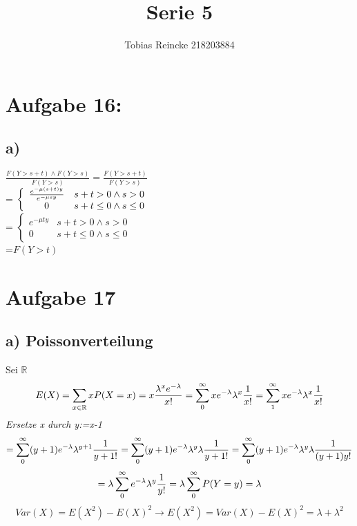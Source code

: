 \documentclass[11pt]{article} %
\title{\color{blue} Serie 5 }
\author{Tobias Reincke 218203884 \\}
\begin{document}
	
\maketitle
\section*{\textbf Aufgabe 16:}

\subsection*{a)}
$\frac{ F(Y >s+t) \land F(Y>s)}{F(Y>s)} = \frac{F(Y>s+t)}{F(Y>s)}$\\
= $\left\{\\
\begin{array}{cc}
  \frac{e^{-\mu (s+t)y}}{e^{-\mu s y}}   & s+t > 0 \land s  > 0 \\
  0 & s+t \leq 0 \land s \leq 0 
\end{array}\right. $\\
= $\left\{
 \begin{array}{cc}
  e^{-\mu t y}   & s+t > 0 \land s  >0 \\
  0 & s+t \leq 0 \land s \leq 0
\end{array} \right. $
\\=$F(Y>t)$
\section*{\textbf Aufgabe 17}
\subsection*{a) Poissonverteilung}
Sei $\mathbb{R}$   
$$ E(X) =
\sum_{x \in \mathbb{R} } x P(X = x) \\
= x \frac{ \lambda^x e^{-\lambda}}{x!} \\
= \sum_{0}^{\infty} x e^{-\lambda} \lambda^x \frac{1}{x!} \\
= \sum_{1}^{\infty} x e^{-\lambda} \lambda^x \frac{1}{x!} \\
$$
 \textit{Ersetze x durch y:=x-1 }
$$
= \sum_{0}^{\infty} (y+1) e^{-\lambda} \lambda^{y+1} \frac{1}{y+1!} \\
= \sum_{0}^{\infty} (y+1) e^{-\lambda} \lambda^{y} \lambda \frac{1}{y+1!} \\
= \sum_{0}^{\infty} (y+1) e^{-\lambda} \lambda^{y} \lambda \frac{1}{(y+1) y!} \\ $$
$$
= \lambda \sum_{0}^{\infty}  e^{-\lambda} \lambda^{y}  \frac{1}{y!} = \lambda \sum_{0}^{\infty} P(Y=y)  \\
= \lambda	
$$
\noindent\makebox[\linewidth]{\rule{\textwidth}{0.4pt}}
$$ Var(X)= E(X^2) -E(X)^2 
\rightarrow  E(X^2) = Var (X) - E(X)^2 = \lambda + \lambda^2 $$
\end{document}
